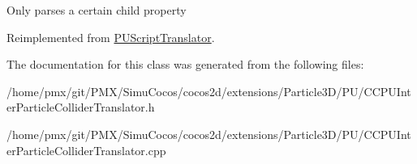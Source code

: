 Only parses a certain child property 

Reimplemented from \hyperlink{classPUScriptTranslator_a0374d83a8a04e57918975d525e0f8fe8}{P\+U\+Script\+Translator}.



The documentation for this class was generated from the following files\+:\begin{DoxyCompactItemize}
\item 
/home/pmx/git/\+P\+M\+X/\+Simu\+Cocos/cocos2d/extensions/\+Particle3\+D/\+P\+U/C\+C\+P\+U\+Inter\+Particle\+Collider\+Translator.\+h\item 
/home/pmx/git/\+P\+M\+X/\+Simu\+Cocos/cocos2d/extensions/\+Particle3\+D/\+P\+U/C\+C\+P\+U\+Inter\+Particle\+Collider\+Translator.\+cpp\end{DoxyCompactItemize}
